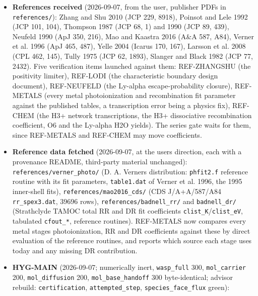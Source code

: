 \documentclass[english,a4paper]{my_memo}
\begin{document}
\begin{itemize}
  \texttt{docs/code\_comparison.tex}. \textbf{Recorded for the user:} every \texttt{src/tests/*/}
  suite of this series (19 directories) and the 2026-09-05/06 design and
  plan documents are untracked in git; a fresh clone of the remote carries
  none of them.
\item
  \textbf{References received} (2026-09-07, from the user, publisher PDFs in
  \texttt{references/}): Zhang and Shu 2010 (JCP 229, 8918), Poinsot and Lele 1992
  (JCP 101, 104), Thompson 1987 (JCP 68, 1) and 1990 (JCP 89, 439), Neufeld
  1990 (ApJ 350, 216), Mao and Kaastra 2016 (A\&A 587, A84), Verner et al.
  1996 (ApJ 465, 487), Yelle 2004 (Icarus 170, 167), Larsson et al. 2008 (CPL
  462, 145), Tully 1975 (JCP 62, 1893), Slanger and Black 1982 (JCP 77,
  2432). Five verification items launched against them: REF-ZHANGSHU (the
  positivity limiter), REF-LODI (the characteristic boundary design
  document), REF-NEUFELD (the Ly-alpha escape-probability closure),
  REF-METALS (every metal photoionization and recombination fit parameter
  against the published tables, a transcription error being a physics fix),
  REF-CHEM (the H3+ network transcriptions, the H3+ dissociative
  recombination coefficient, O6 and the Ly-alpha H2O yields). The series
  gate waits for them, since REF-METALS and REF-CHEM may move coefficients.
\item
  \textbf{Reference data fetched} (2026-09-07, at the user\textquotesingle s direction, each with
  a provenance README, third-party material unchanged): \texttt{references/verner\_photo/}
  (D. A. Verner\textquotesingle s distribution: \texttt{phfit2.f} reference routine with its fit
  parameters, \texttt{table1.dat} of Verner et al. 1996, the 1995 inner-shell fits),
  \texttt{references/mao2016\_cds/} (CDS J/A+A/587/A84 \texttt{rr\_spex3.dat}, 39696 rows),
  \texttt{references/badnell\_rr/} and \texttt{badnell\_dr/} (Strathclyde TAMOC total RR and
  DR fit coefficients \texttt{clist\_K}/\texttt{clist\_eV}, tabulated \texttt{cfout\_*}, reference
  routines). REF-METALS now compares every metal stage\textquotesingle s photoionization, RR
  and DR coefficients against these by direct evaluation of the reference
  routines, and reports which source each stage uses today and any missing
  DR contribution.
\item
  \textbf{HYG-MAIN} (2026-09-07; numerically inert, \texttt{wasp\_full} 300, \texttt{mol\_carrier}
  200, \texttt{mol\_diffusion} 200, \texttt{mol\_base\_handoff} 300 byte-identical; advisor
  rebuild: \texttt{certification}, \texttt{attempted\_step}, \texttt{species\_face\_flux} green):

\end{itemize}
\end{document}
